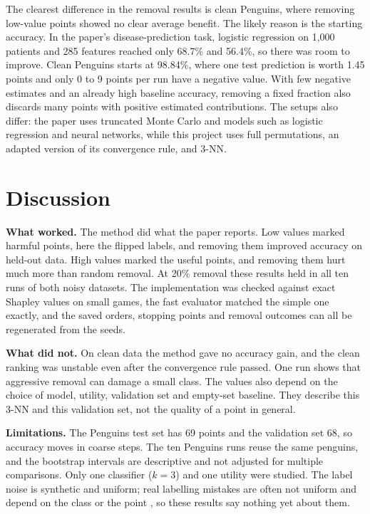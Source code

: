 \documentclass[10pt]{article}
\begin{document}
The clearest difference in the removal results is clean Penguins, where removing low-value points showed no clear average benefit. The likely reason is the starting accuracy. In the paper's disease-prediction task, logistic regression on 1,000 patients and 285 features reached only 68.7\% and 56.4\%, so there was room to improve. Clean Penguins starts at 98.84\%, where one test prediction is worth 1.45 points and only 0 to 9 points per run have a negative value. With few negative estimates and an already high baseline accuracy, removing a fixed fraction also discards many points with positive estimated contributions. The setups also differ: the paper uses truncated Monte Carlo and models such as logistic regression and neural networks, while this project uses full permutations, an adapted version of its convergence rule, and 3-NN.

\section{Discussion}
\textbf{What worked.} The method did what the paper reports. Low values marked harmful points, here the flipped labels, and removing them improved accuracy on held-out data. High values marked the useful points, and removing them hurt much more than random removal. At 20\% removal these results held in all ten runs of both noisy datasets. The implementation was checked against exact Shapley values on small games, the fast evaluator matched the simple one exactly, and the saved orders, stopping points and removal outcomes can all be regenerated from the seeds.

\textbf{What did not.} On clean data the method gave no accuracy gain, and the clean ranking was unstable even after the convergence rule passed. One run shows that aggressive removal can damage a small class. The values also depend on the choice of model, utility, validation set and empty-set baseline. They describe this 3-NN and this validation set, not the quality of a point in general.

\textbf{Limitations.} The Penguins test set has 69 points and the validation set 68, so accuracy moves in coarse steps. The ten Penguins runs reuse the same penguins, and the bootstrap intervals are descriptive and not adjusted for multiple comparisons. Only one classifier ($k=3$) and one utility were studied. The label noise is synthetic and uniform; real labelling mistakes are often not uniform and depend on the class or the point \citep{frenay2014}, so these results say nothing yet about them.
\end{document}
